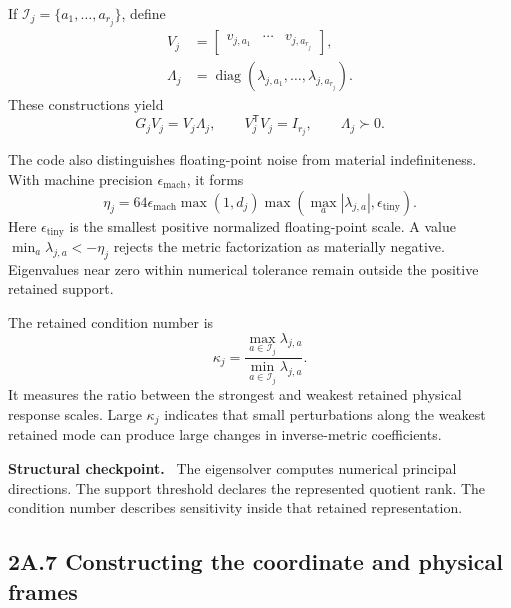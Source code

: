 \documentclass[10pt,twocolumn]{article}
\newcommand{\conceptbreak}{\par\medskip\noindent{\color{black!30}\rule{\columnwidth}{0.35pt}}\par\medskip}
\newenvironment{insight}{\begin{center}\begin{minipage}{0.94\columnwidth}\color{blue!35!black}\textbf{Structural checkpoint.}\ }{\end{minipage}\end{center}}
\begin{document}
If \(\mathcal I_j=\{a_1,\ldots,a_{r_j}\}\), define
\begin{align}
V_j
&=\begin{bmatrix}
v_{j,a_1}&\cdots&v_{j,a_{r_j}}
\end{bmatrix},
\label{eq:bridge-retained-vectors}\\
\Lambda_j
&=\operatorname{diag}
(\lambda_{j,a_1},\ldots,\lambda_{j,a_{r_j}}).
\label{eq:bridge-retained-values}
\end{align}
These constructions yield
\begin{equation}
G_jV_j=V_j\Lambda_j,
\qquad
V_j^{\mathsf T}V_j=I_{r_j},
\qquad
\Lambda_j\succ0.
\label{eq:bridge-supported-eigensystem}
\end{equation}

The code also distinguishes floating-point noise from material indefiniteness.
With machine precision \(\epsilon_{\mathrm{mach}}\), it forms
\begin{equation}
\eta_j=
64\epsilon_{\mathrm{mach}}\max(1,d_j)
\max\left(\max_a|\lambda_{j,a}|,\epsilon_{\mathrm{tiny}}\right).
\label{eq:bridge-negative-tolerance}
\end{equation}
Here \(\epsilon_{\mathrm{tiny}}\) is the smallest positive normalized
floating-point scale. A value
\(\min_a\lambda_{j,a}< -\eta_j\) rejects the metric factorization as
materially negative. Eigenvalues near zero within numerical tolerance remain
outside the positive retained support.

The retained condition number is
\begin{equation}
\kappa_j
=\frac{\max_{a\in\mathcal I_j}\lambda_{j,a}}
{\min_{a\in\mathcal I_j}\lambda_{j,a}}.
\label{eq:bridge-supported-condition-number}
\end{equation}
It measures the ratio between the strongest and weakest retained physical
response scales. Large \(\kappa_j\) indicates that small perturbations along
the weakest retained mode can produce large changes in inverse-metric
coefficients.

\begin{insight}
The eigensolver computes numerical principal directions. The support threshold
declares the represented quotient rank. The condition number describes
sensitivity inside that retained representation.
\end{insight}

\conceptbreak

\subsection*{2A.7 Constructing the coordinate and physical frames}
\end{document}

